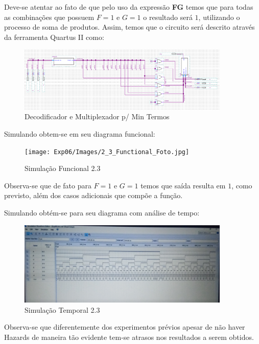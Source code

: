 \documentclass[12pt]{article}
\begin{document}
Deve-se atentar ao fato de que pelo uso da expressão \textbf{FG} temos que para todas as combinações que possuem $F=1$ e $G=1$ o resultado será $1$, utilizando o processo de soma de produtos. Assim, temos que o circuito será descrito através da ferramenta Quartus II como:

\begin{figure}[H]
  \centering
  \includegraphics[width=0.9\textwidth]{Exp06/Images/2_3_Circuit.png}
  \caption{Decodificador e Multiplexador p/ Min Termos}\label{fig:2_3_Circuit.png}
\end{figure}

Simulando obtem-se em seu diagrama funcional:

\begin{figure}[H]
  \centering
  \texttt{[image: Exp06/Images/2\_3\_Functional\_Foto.jpg]}
  \caption{Simulação Funcional 2.3}\label{fig:2_3_Functional_Foto.jpg}
\end{figure}

Observa-se que de fato para $F=1$ e $G=1$ temos que saída resulta em $1$, como previsto, além dos casos adicionais que compõe a função.

Simulando obtém-se para seu diagrama com análise de tempo:

\begin{figure}[H]
  \centering
  \includegraphics[width=0.9\textwidth]{Exp06/Images/2_3_Timing.jpg}
  \caption{Simulação Temporal 2.3}\label{fig:2_3_Timing_Foto.jpg}
\end{figure}

Observa-se que diferentemente dos experimentos prévios apesar de não haver Hazards de maneira tão evidente tem-se atrasos nos resultados a serem obtidos.
\end{document}
